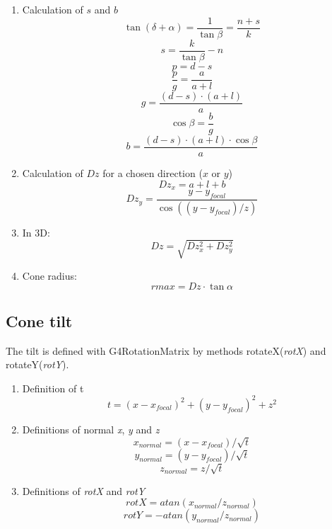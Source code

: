 \documentclass[12pt]{article}
\begin{document}
\begin{enumerate}
\item Calculation of $s$ and $b$ 
	$$\tan(\delta+\alpha)=\frac{1}{\tan{\beta}} =\frac{n+s}{k}$$
	  \begin{equation} 	
	\boxed{s=\frac{k}{\tan{\beta}}-n}
	\end{equation}
	$$p=d-s$$
	$$\frac{p}{g}=\frac{a}{a+l}$$
	$$g=\frac{(d-s)\cdot(a+l)}{a}$$ 
	$$\cos\beta=\frac{b}{g}$$
	  \begin{equation} 	
	\boxed{b=\frac{(d-s)\cdot(a+l)\cdot\cos\beta}{a}}
	\end{equation}
\item Calculation of $Dz$ for a chosen direction ($x$ or $y$)
\begin{equation} 
	\boxed{Dz_x=a+l+b}			
\end{equation}
\begin{equation} 
	\boxed{Dz_y=\frac{y-y_{focal}}{\cos{((y-y_{focal})/z)} }}			
\end{equation}	
\item In 3D: 
\begin{equation} 
	\boxed{Dz=\sqrt{Dz_{x}^{2}+Dz_{y}^{2}}}		
\end{equation}

\item Cone radius: 
\begin{equation} 
	\boxed{rmax=Dz\cdot\tan{\alpha}}			
\end{equation}
	
\end{enumerate}



\subsection{Cone tilt}

The tilt is defined with G4RotationMatrix by methods rotateX(\textit{rotX}) and rotateY(\textit{rotY}).

\begin{enumerate}
\item Definition of t
	\begin{equation} 
	t=(x-x_{focal})^2+(y-y_{focal})^2+z^2		
	\end{equation}
\item Definitions of normal \textit{x}, \textit{y} and \textit{z}
	\begin{equation} 
	x_{normal}=(x-x_{focal})/\sqrt{t}		
	\end{equation}
	\begin{equation} 
	y_{normal}=(y-y_{focal})/\sqrt{t}			
	\end{equation}
	\begin{equation} 
	z_{normal}=z/\sqrt{t}		
	\end{equation}

\item Definitions of \textit{rotX} and \textit{rotY}
	\begin{equation} 
	\boxed{rotX=atan(x_{normal}/z_{normal})}	
	\end{equation}
	\begin{equation} 
	\boxed{rotY=-atan(y_{normal}/z_{normal})}	
	\end{equation}
 \end{enumerate}
 
\end{document}
